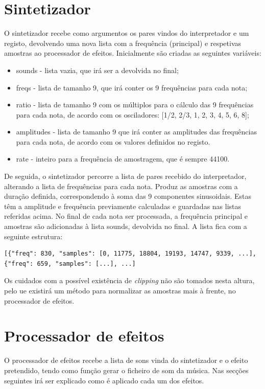 \section{Sintetizador}
O sintetizador recebe como argumentos os pares vindos do interpretador e um registo, devolvendo uma nova lista com a frequência (principal) e respetivas amostras ao processador de efeitos. Inicialmente são criadas as seguintes variáveis:

\begin{itemize}
\item sounds - lista vazia, que irá ser a devolvida no final;
\item freqs - lista de tamanho 9, que irá conter os 9 frequências para cada nota;
\item ratio - lista de tamanho 9 com os múltiplos para o cálculo das 9 frequências para cada nota, de acordo com os osciladores: [1/2, 2/3, 1, 2, 3, 4, 5, 6, 8];
\item amplitudes - lista de tamanho 9 que irá conter as amplitudes das frequências para cada nota, de acordo com os valores definidos no registo.
\item rate - inteiro para a frequência de amostragem, que é sempre 44100.
\end{itemize}

De seguida, o sintetizador percorre a lista de pares recebido do interpretador, alterando a lista de frequências para cada nota. Produz as amostras com a duração definida, correspondendo à soma das 9 componentes sinusoidais. Estas têm a amplitude e frequência previamente calculadas e guardadas nas listas referidas acima. No final de cada nota ser processada, a frequência principal e amostras são adicionadas à lista sounds, devolvida no final. A lista fica com a seguinte estrutura:

\vspace{5mm}
\begin{lstlisting}
[{"freq": 830, "samples": [0, 11775, 18804, 19193, 14747, 9339, ...], {"freq": 659, "samples": [...], ...]
\end{lstlisting}
\vspace{5mm}

Os cuidados com a possível existência de \emph{clipping} não são tomados nesta altura, pelo ue existirá um método para normalizar as amostras mais à frente, no processador de efeitos.

\section{Processador de efeitos}
O processador de efeitos recebe a lista de sons vinda do sintetizador e o efeito pretendido, tendo como função gerar o ficheiro de som da música. Nas secções seguintes irá ser explicado como é aplicado cada um dos efeitos.

